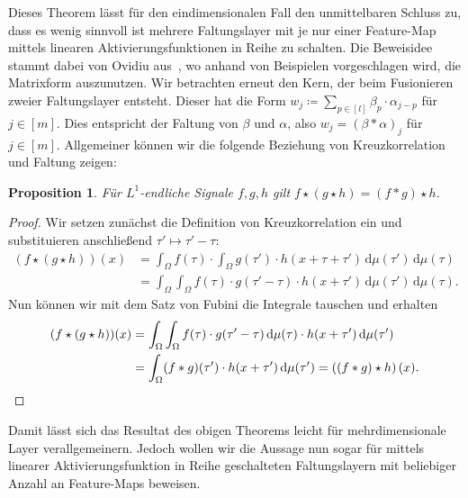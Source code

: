 \documentclass[paper=a4, 	%
		fontsize=11pt,
		abstract=true, 	%
		headsepline, 	%
		notitlepage	%
		]{scrartcl}
\newtheorem{proposition}[theorem]{Proposition}
\theoremstyle{definition}
\newcommand{\diff}{\,\textrm{d}}
\newcommand{\fNat}[1]{[ #1 ]}
\begin{document}
Dieses Theorem lässt für den eindimensionalen Fall den unmittelbaren Schluss zu, dass es wenig sinnvoll ist mehrere Faltungslayer mit je nur einer Feature-Map mittels linearen Aktivierungsfunktionen in Reihe zu schalten.
Die Beweisidee stammt dabei von Ovidiu aus~\cite{Calin2020}, wo anhand von Beispielen vorgeschlagen wird, die Matrixform auszunutzen.
Wir betrachten erneut den Kern, der beim Fusionieren zweier Faltungslayer entsteht.
Dieser hat die Form $w_j \coloneqq \sum_{p\in\fNat{l}} \beta_p \cdot \alpha_{j-p}$ für $j\in\fNat{m}$.
Dies entspricht der Faltung von $\beta$ und $\alpha$, also $w_j = (\beta * \alpha)_j$ für $j\in\fNat{m}$.
Allgemeiner können wir die folgende Beziehung von Kreuzkorrelation und Faltung zeigen:
\begin{proposition}\label{prop:associativity-cross-corr}
    Für $L^1$-endliche Signale $f,g,h$ gilt $f\star (g \star h) = (f*g)\star h$.
\end{proposition}
\begin{proof}
    Wir setzen zunächst die Definition von Kreuzkorrelation ein und substituieren anschließend $\tau' \mapsto \tau' - \tau$:
    \begin{align*}
        (f\star (g\star h))(x)
        &= \int_\Omega f(\tau) \cdot \int_\Omega g(\tau') \cdot h(x+\tau+\tau')\diff\mu(\tau') \diff \mu(\tau) \\
        &= \int_\Omega \int_\Omega f(\tau) \cdot g(\tau' - \tau)\cdot h(x+\tau')\diff\mu(\tau') \diff \mu(\tau).
    \end{align*}
    Nun können wir mit dem Satz von Fubini die Integrale tauschen und erhalten
    \begin{align*}
        (f\star (g\star h))(x)&= \int_\Omega\int_\Omega f(\tau) \cdot g(\tau'-\tau) \diff\mu(\tau) \cdot h(x+\tau')\diff\mu(\tau') \\
        &= \int_\Omega  (f * g)(\tau')\cdot h(x+\tau') \diff \mu(\tau')
        = \left( (f * g) \star h \right)(x).\qedhere
    \end{align*}
\end{proof}

Damit lässt sich das Resultat des obigen Theorems leicht für mehrdimensionale Layer verallgemeinern.
Jedoch wollen wir die Aussage nun sogar für mittels linearer Aktivierungsfunktion in Reihe geschalteten Faltungslayern mit beliebiger Anzahl an Feature-Maps beweisen.
\end{document}
